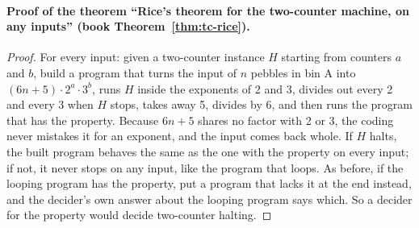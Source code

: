 \documentclass[11pt,twoside]{article}
\theoremstyle{thielethm}
\theoremstyle{thieledef}
\theoremstyle{thieledef}
\theoremstyle{thieledef}
\theoremstyle{thielethm}
\theoremstyle{thieleobs}
\theoremstyle{thielethm}
\begin{document}
\paragraph{Proof of the theorem ``Rice's theorem for the two-counter machine, on any inputs'' (book Theorem~\ref{thm:tc-rice}).}
\begin{proof}
For every input: given a two-counter instance $H$ starting from counters $a$ and $b$, build a program
that turns the input of $n$ pebbles in bin A into $(6n + 5) \cdot 2^a \cdot 3^b$, runs $H$ inside the
exponents of 2 and 3, divides out every 2 and every 3 when $H$ stops, takes away 5, divides by 6, and
then runs the program that has the property. Because $6n + 5$ shares no factor with 2 or 3, the coding
never mistakes it for an exponent, and the input comes back whole. If $H$ halts, the built program
behaves the same as the one with the property on every input; if not, it never stops on any input,
like the program that loops. As before, if the looping program has the property, put a program
that lacks it at the end instead, and the decider's own answer about the looping program says
which. So a decider for the property would decide two-counter halting.
\end{proof}
\end{document}

